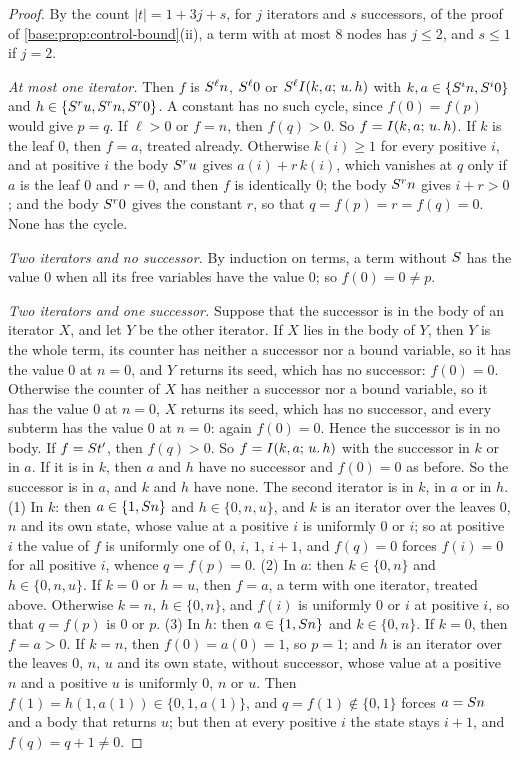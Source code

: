 \begin{proof}
By the count $|t|=1+3j+s$, for $j$ iterators and $s$ successors, of the
proof of \cref{base:prop:control-bound}(ii), a term with at most $8$ nodes
has $j\le 2$, and $s\le 1$ if $j=2$.

\emph{At most one iterator.}  Then $f$ is $S^\ell n$, $S^\ell 0$ or
$S^\ell I(k,a;\,u.\,h)$ with $k,a\in\{S^i n,S^i 0\}$ and
$h\in\{S^r u,S^r n,S^r 0\}$.  A constant has no such cycle, since
$f(0)=f(p)$ would give $p=q$.  If $\ell>0$ or $f=n$, then $f(q)>0$.  So
$f=I(k,a;\,u.\,h)$.  If $k$ is the leaf $0$, then $f=a$, treated already.
Otherwise $k(i)\ge 1$ for every positive $i$, and at positive $i$ the body
$S^r u$ gives $a(i)+r\,k(i)$, which vanishes at $q$ only if $a$ is the leaf
$0$ and $r=0$, and then $f$ is identically $0$; the body $S^r n$ gives
$i+r>0$; and the body $S^r 0$ gives the constant $r$, so that
$q=f(p)=r=f(q)=0$.  None has the cycle.

\emph{Two iterators and no successor.}  By induction on terms, a term
without $S$ has the value $0$ when all its free variables have the value
$0$; so $f(0)=0\neq p$.

\emph{Two iterators and one successor.}  Suppose that the successor is in the
body of an iterator $X$, and let $Y$ be the other iterator.  If $X$ lies in
the body of $Y$, then $Y$ is the whole term, its counter has neither a
successor nor a bound variable, so it has the value $0$ at $n=0$, and $Y$
returns its seed, which has no successor: $f(0)=0$.  Otherwise the counter of
$X$ has neither a successor nor a bound variable, so it has the value $0$ at
$n=0$, $X$ returns its seed, which has no successor, and every subterm has
the value $0$ at $n=0$: again $f(0)=0$.  Hence the successor is in no body.
If $f=S t'$, then $f(q)>0$.  So $f=I(k,a;\,u.\,h)$ with the successor in
$k$ or in $a$.  If it is in $k$, then $a$ and $h$ have no successor and
$f(0)=0$ as before.  So the successor is in $a$, and $k$ and $h$ have none.
The second iterator is in $k$, in $a$ or in $h$.
(1) In $k$: then $a\in\{1,S n\}$ and $h\in\{0,n,u\}$, and $k$ is an
iterator over the leaves $0$, $n$ and its own state, whose value at a
positive $i$ is uniformly $0$ or $i$; so at positive $i$ the value of $f$ is
uniformly one of $0$, $i$, $1$, $i+1$, and $f(q)=0$ forces $f(i)=0$ for all
positive $i$, whence $q=f(p)=0$.
(2) In $a$: then $k\in\{0,n\}$ and $h\in\{0,n,u\}$.  If $k=0$ or $h=u$, then
$f=a$, a term with one iterator, treated above.  Otherwise $k=n$,
$h\in\{0,n\}$, and $f(i)$ is uniformly $0$ or $i$ at positive $i$, so that
$q=f(p)$ is $0$ or $p$.
(3) In $h$: then $a\in\{1,S n\}$ and $k\in\{0,n\}$.  If $k=0$, then
$f=a>0$.  If $k=n$, then $f(0)=a(0)=1$, so $p=1$; and $h$ is an iterator
over the leaves $0$, $n$, $u$ and its own state, without successor, whose
value at a positive $n$ and a positive $u$ is uniformly $0$, $n$ or $u$.
Then $f(1)=h(1,a(1))\in\{0,1,a(1)\}$, and $q=f(1)\notin\{0,1\}$ forces $a=S n$
and a body that returns $u$; but then at every positive $i$ the state stays
$i+1$, and $f(q)=q+1\neq 0$.


\end{proof}
